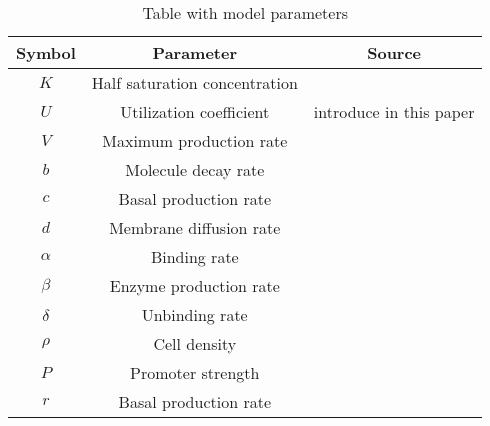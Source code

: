 \documentclass[runningheads]{llncs}
\begin{document}
 \begin{table}[t]
\centering
\begin{tabular}{|c|c|c|}
\hline
\bf Symbol  & \bf Parameter & \bf Source\\ \hline
\small $K$ & Half saturation concentration &  \cite{Melke2010}\cite{Fagerlind2005} \\ \hline
\small $U$ & Utilization coefficient &  introduce in this paper \\ \hline
\small $V$ & Maximum production rate &   \small \cite{Melke2010}\cite{Fagerlind2005} \\ \hline
\small $b$ & Molecule decay rate &   \cite{Melke2010}\cite{Fagerlind2005} \\ \hline
\small $c$ & Basal production rate &  \small \cite{Melke2010}\cite{Fagerlind2005} \\ \hline
\small $d$ & Membrane diffusion rate &  \small \cite{Fagerlind2005}\\ \hline
\small $\alpha$ & Binding rate  &  \small \cite{Melke2010}\cite{Fagerlind2005} \\ \hline
\small $\beta$ & Enzyme production rate&  \small \cite{Melke2010}\cite{Fagerlind2005}\\ \hline
\small $\delta$  & Unbinding rate &  \small \cite{Melke2010}\cite{Fagerlind2005} \\ \hline
\small $\rho$  & Cell density &  \small \cite{Fagerlind2005} \\ \hline
\small $P$  & Promoter strength &  \small \cite{Voigt2006} \\ \hline
\small $r$  & Basal production rate &  \small \cite{Voigt2006} \\ \hline
\end{tabular}
\caption{\label{parameters} Table with model parameters}
\end{table} 
  
\end{document}
